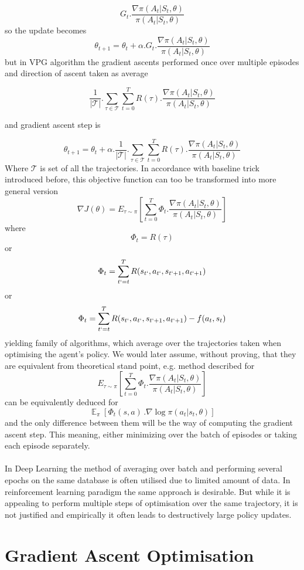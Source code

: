 \documentclass{article}
\DeclareMathOperator{\E}{\mathbb{E}}
\begin{document}
$$
G_t.\frac{\nabla \pi (A_t |S_t, \theta)}{\pi (A_t |S_t, \theta)}
$$
so the update becomes
$$
\theta_{t+1} = \theta_{t} + \alpha .G_t.\frac{\nabla \pi (A_t |S_t, \theta)}{\pi (A_t |S_t, \theta)}
$$
but in VPG algorithm the gradient ascents performed once over multiple episodes and direction of ascent taken as average

$$
\frac{1}{|\mathcal{T}|}.\sum_{\tau\in\mathcal{T}} \sum_{t=0}^T R(\tau) .\frac{\nabla \pi (A_t |S_t, \theta)}{\pi (A_t |S_t, \theta)}
$$

and gradient ascent step is

$$
\theta_{t+1} = \theta_{t} + \alpha .\frac{1}{|\mathcal{T}|}.\sum_{\tau\in\mathcal{T}} \sum_{t=0}^T R(\tau) .\frac{\nabla \pi (A_t |S_t, \theta)}{\pi (A_t |S_t, \theta)}
$$
Where $\mathcal{T}$ is set of all the trajectories. In accordance with baseline trick introduced before, this objective function can too be transformed into more general version
$$
\nabla J(\theta) = E_{\tau \sim\pi}\left[ \sum_{t=0}^T \Phi_t .\frac{\nabla \pi (A_t |S_t, \theta)}{\pi (A_t |S_t, \theta)}\right]
$$
where 
$$
\Phi_t = R(\tau)
$$
or
$$
\Phi_t = \sum_{t`=t}^TR(s_{t`}, a_{t`}, s_{t`+1}, a_{t`+1})
$$
or
$$
\Phi_t = \sum_{t`=t}^TR(s_{t`}, a_{t`}, s_{t`+1}, a_{t`+1}) - f(a_t, s_t)
$$
yielding family of algorithms, which average over the trajectories taken when optimising the agent's policy. We would later assume, without proving, that they are equivalent from theoretical stand point, e.g. method described for 
$$
E_{\tau \sim\pi}\left[ \sum_{t=0}^T \Phi_t .\frac{\nabla \pi (A_t |S_t, \theta)}{\pi (A_t |S_t, \theta)}\right]
$$
can be equivalently deduced for 
$$
\E_\pi \left[\Phi_t(s, a)\, .\nabla \log \pi(a_t |s_t, \theta)  \right]
$$
and the only difference between them will be the way of computing the gradient ascent step. This meaning, either minimizing over the batch of episodes or taking each episode separately.
\\ \\
In Deep Learning the method of averaging over batch and performing several epochs on the same database is often utilised due to limited amount of data. In reinforcement learning paradigm the same approach is desirable. But while it is appealing to perform multiple steps of optimisation over the same trajectory, it is not justified and empirically it often leads to destructively large policy updates.
\section{Gradient Ascent Optimisation}
\end{document}

